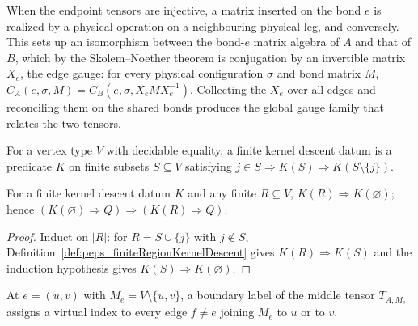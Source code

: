 When the endpoint tensors are injective, a matrix inserted on the bond $e$ is
realized by a physical operation on a neighbouring physical leg, and conversely.
This sets up an isomorphism between the bond-$e$ matrix algebra of $A$ and that
of $B$, which by the Skolem--Noether theorem is conjugation by an invertible
matrix $X_e$, the edge gauge: for every physical configuration $\sigma$ and bond
matrix $M$,
$C_A(e,\sigma,M)=C_B(e,\sigma,X_eMX_e^{-1})$.
Collecting the $X_e$ over all edges and reconciling them on the shared bonds
produces the global gauge family that relates the two tensors.

\begin{definition}%
    \label{def:peps_finiteRegionKernelDescent}
    \leanok
    For a vertex type $V$ with decidable equality, a finite kernel descent
    datum is a predicate $K$ on finite subsets $S\subseteq V$ satisfying
    $j\in S\Longrightarrow K(S)\Longrightarrow K(S\setminus\{j\})$.
\end{definition}

\begin{lemma}%
    \label{lem:peps_finiteRegionKernelDescent}
    \leanok
    For a finite kernel descent datum $K$ and any finite $R\subseteq V$,
    $K(R)\Longrightarrow K(\varnothing)$; hence
    $(K(\varnothing)\Longrightarrow Q)\Longrightarrow(K(R)\Longrightarrow Q)$.
\end{lemma}
\begin{proof}\leanok
    Induct on $|R|$: for $R=S\cup\{j\}$ with $j\notin S$,
    Definition~\ref{def:peps_finiteRegionKernelDescent} gives
    $K(R)\Longrightarrow K(S)$ and the induction hypothesis gives
    $K(S)\Longrightarrow K(\varnothing)$.
\end{proof}

\begin{definition}%
    \label{def:peps_edgeMiddleBoundaryLabel}
    \leanok
    At $e=(u,v)$ with $M_e=V\setminus\{u,v\}$, a boundary label of the middle
    tensor $T_{A,M_e}$ assigns a virtual index to every edge $f\neq e$ joining
    $M_e$ to $u$ or to $v$.
\end{definition}

